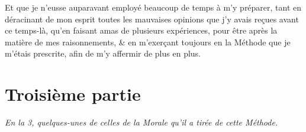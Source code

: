 \documentclass[french,twoside]{book} %
\newenvironment{argument}{\itshape\parindent0pt}{\bigskip}
\newcommand\chapteropen{} %
\newcommand\chapterclose{} %
\begin{document}
Et que je n’eusse auparavant employé beaucoup de temps à m’y préparer, tant en déracinant de mon esprit toutes les mauvaises opinions que j’y avais reçues avant ce temps-là, qu’en faisant amas de plusieurs expériences, pour être après la matière de mes raisonnements, \& en m’exerçant toujours en la Méthode que je m’étais prescrite, afin de m’y affermir de plus en plus.
\chapterclose


\chapteropen

\chapter[{Troisième partie}]{Troisième partie}
\renewcommand{\leftmark}{Troisième partie}
\label{III}


\begin{argument}
En la 3, quelques-unes de celles de la Morale qu’il a tirée de cette Méthode.

\end{argument}
\end{document}
